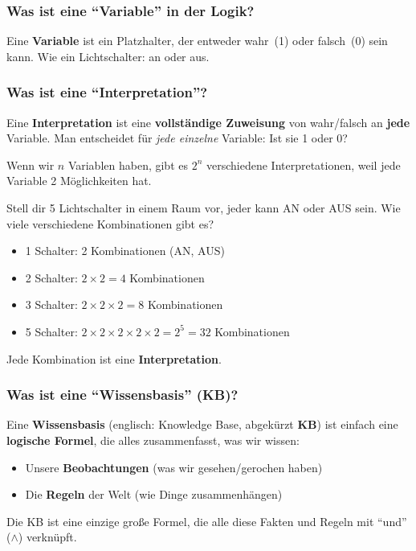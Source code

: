 \documentclass[a4paper,12pt]{article}
\begin{document}
\subsubsection*{Was ist eine "`Variable"' in der Logik?}

Eine \textbf{Variable} ist ein Platzhalter, der entweder wahr~(1) oder falsch~(0) sein kann. Wie ein Lichtschalter: an oder aus.

\subsubsection*{Was ist eine "`Interpretation"'?}

\begin{merkbox}
Eine \textbf{Interpretation} ist eine \textbf{vollst\"andige Zuweisung} von wahr/falsch an \textbf{jede} Variable. Man entscheidet f\"ur \textit{jede einzelne} Variable: Ist sie 1 oder 0?

\medskip
Wenn wir $n$ Variablen haben, gibt es $2^n$ verschiedene Interpretationen, weil jede Variable 2 M\"oglichkeiten hat.
\end{merkbox}

\begin{analogie}[title={Analogie: Lichtschalter}]
Stell dir 5 Lichtschalter in einem Raum vor, jeder kann AN oder AUS sein.
Wie viele verschiedene Kombinationen gibt es?

\medskip
\begin{itemize}
\item 1 Schalter: 2 Kombinationen (AN, AUS)
\item 2 Schalter: $2 \times 2 = 4$ Kombinationen
\item 3 Schalter: $2 \times 2 \times 2 = 8$ Kombinationen
\item 5 Schalter: $2 \times 2 \times 2 \times 2 \times 2 = 2^5 = 32$ Kombinationen
\end{itemize}

Jede Kombination ist eine \textbf{Interpretation}.
\end{analogie}

\subsubsection*{Was ist eine "`Wissensbasis"' (KB)?}

\begin{merkbox}
Eine \textbf{Wissensbasis} (englisch: Knowledge Base, abgek\"urzt \textbf{KB}) ist einfach eine \textbf{logische Formel}, die alles zusammenfasst, was wir wissen:
\begin{itemize}
\item Unsere \textbf{Beobachtungen} (was wir gesehen/gerochen haben)
\item Die \textbf{Regeln} der Welt (wie Dinge zusammenh\"angen)
\end{itemize}
Die KB ist eine einzige gro\ss e Formel, die alle diese Fakten und Regeln mit "`und"' ($\wedge$) verkn\"upft.
\end{merkbox}
\end{document}
